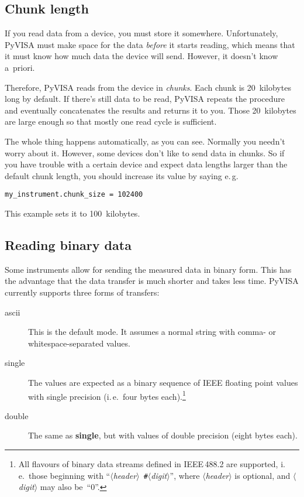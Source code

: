 \documentclass{howto}
\begin{document}
\subsection{Chunk length}
\label{sec:chunk-length}

If you read data from a device, you must store it somewhere.  Unfortunately,
PyVISA must make space for the data \emph{before} it starts reading, which
means that it must know how much data the device will send.  However, it
doesn't know a~priori.

Therefore, PyVISA reads from the device in \emph{chunks}.  Each chunk is
20~kilobytes long by default.  If there's still data to be read, PyVISA repeats
the procedure and eventually concatenates the results and returns it to you.
Those 20~kilobytes are large enough so that mostly one read cycle is
sufficient.

The whole thing happens automatically, as you can see.  Normally you needn't
worry about it.  However, some devices don't like to send data in chunks.  So
if you have trouble with a certain device and expect data lengths larger than
the default chunk length, you should increase its value by saying e.\,g.
\begin{verbatim}
my_instrument.chunk_size = 102400
\end{verbatim}
This example sets it to 100~kilobytes.


\subsection{Reading binary data}
\label{sec:reading-binary-data}

Some instruments allow for sending the measured data in binary form.  This has
the advantage that the data transfer is much shorter and takes less time.
PyVISA currently supports three forms of transfers:

\begin{description}
\item[ascii] This is the default mode.  It assumes a normal string with comma-
  or whitespace-separated values.
\item[single] The values are expected as a binary sequence of IEEE floating
  point values with single precision (i.\,e.\ four bytes each).\footnote{All
    flavours of binary data streams defined in IEEE\,488.2 are supported,
    i.\,e.\ those beginning with
    ``\textit{$\langle$header$\rangle$}~\texttt{\#}\textit{$\langle$digit$\rangle$}'',
    where \textit{$\langle$header$\rangle$} is optional, and
    \textit{$\langle$digit$\rangle$} may also be~``0''.}
\item[double] The same as \textbf{single}, but with values of double precision
  (eight bytes each).
\end{description}
\end{document}

